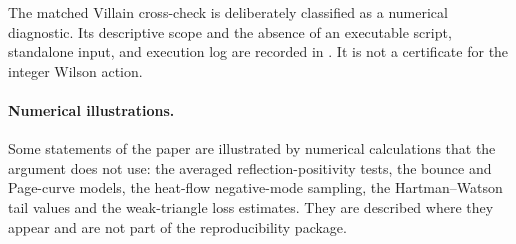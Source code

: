 \par\addvspace{\bigskipamount}
The matched Villain cross-check is deliberately classified as a numerical
diagnostic.  Its descriptive scope and the absence of an executable script,
standalone input, and execution log are recorded in
.
It is not a certificate for the integer Wilson action.
\paragraph{Numerical illustrations.}
Some statements of the paper are illustrated by numerical calculations that the
argument does not use: the averaged reflection-positivity tests, the bounce and
Page-curve models, the heat-flow negative-mode sampling, the Hartman--Watson
tail values and the weak-triangle loss estimates. They are described where they
appear and are not part of the reproducibility package.
